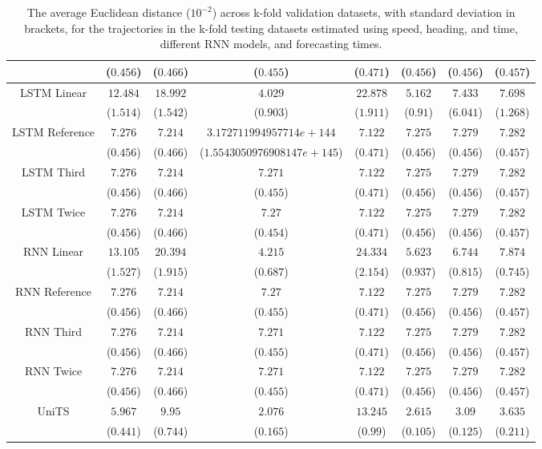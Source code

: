 \begin{table}[!ht]
{\begin{tabular}{|c|c|c|c|c|c|c|c|}
			 & ($0.456$) & ($0.466$) & ($0.455$) & ($0.471$) & ($0.456$) & ($0.456$) & ($0.457$) \\ \hline
			\multirow{2}{*}{LSTM Linear} & $12.484$ & $18.992$ & $4.029$ & $22.878$ & $5.162$ & $7.433$ & $7.698$ \\
			 & ($1.514$) & ($1.542$) & ($0.903$) & ($1.911$) & ($0.91$) & ($6.041$) & ($1.268$) \\ \hline
			\multirow{2}{*}{LSTM Reference} & $7.276$ & $7.214$ & $3.172711994957714e+144$ & $7.122$ & $7.275$ & $7.279$ & $7.282$ \\
			 & ($0.456$) & ($0.466$) & ($1.5543050976908147e+145$) & ($0.471$) & ($0.456$) & ($0.456$) & ($0.457$) \\ \hline
			\multirow{2}{*}{LSTM Third} & $7.276$ & $7.214$ & $7.271$ & $7.122$ & $7.275$ & $7.279$ & $7.282$ \\
			 & ($0.456$) & ($0.466$) & ($0.455$) & ($0.471$) & ($0.456$) & ($0.456$) & ($0.457$) \\ \hline
			\multirow{2}{*}{LSTM Twice} & $7.276$ & $7.214$ & $7.27$ & $7.122$ & $7.275$ & $7.279$ & $7.282$ \\
			 & ($0.456$) & ($0.466$) & ($0.454$) & ($0.471$) & ($0.456$) & ($0.456$) & ($0.457$) \\ \hline
			\multirow{2}{*}{RNN Linear} & $13.105$ & $20.394$ & $4.215$ & $24.334$ & $5.623$ & $6.744$ & $7.874$ \\
			 & ($1.527$) & ($1.915$) & ($0.687$) & ($2.154$) & ($0.937$) & ($0.815$) & ($0.745$) \\ \hline
			\multirow{2}{*}{RNN Reference} & $7.276$ & $7.214$ & $7.27$ & $7.122$ & $7.275$ & $7.279$ & $7.282$ \\
			 & ($0.456$) & ($0.466$) & ($0.455$) & ($0.471$) & ($0.456$) & ($0.456$) & ($0.457$) \\ \hline
			\multirow{2}{*}{RNN Third} & $7.276$ & $7.214$ & $7.271$ & $7.122$ & $7.275$ & $7.279$ & $7.282$ \\
			 & ($0.456$) & ($0.466$) & ($0.455$) & ($0.471$) & ($0.456$) & ($0.456$) & ($0.457$) \\ \hline
			\multirow{2}{*}{RNN Twice} & $7.276$ & $7.214$ & $7.271$ & $7.122$ & $7.275$ & $7.279$ & $7.282$ \\
			 & ($0.456$) & ($0.466$) & ($0.455$) & ($0.471$) & ($0.456$) & ($0.456$) & ($0.457$) \\ \hline
			\multirow{2}{*}{UniTS} & $5.967$ & $9.95$ & $2.076$ & $13.245$ & $2.615$ & $3.09$ & $3.635$ \\
			 & ($0.441$) & ($0.744$) & ($0.165$) & ($0.99$) & ($0.105$) & ($0.125$) & ($0.211$) \\ \hline
		\end{tabular}
	}
	\caption{The average Euclidean distance ($10^{-2}$) across k-fold validation datasets, with standard deviation in brackets, for the trajectories in the k-fold testing datasets estimated using speed, heading, and time, different RNN models, and forecasting times.}
	\label{tab:all_speed_actual_dir_euclid}
\end{table}